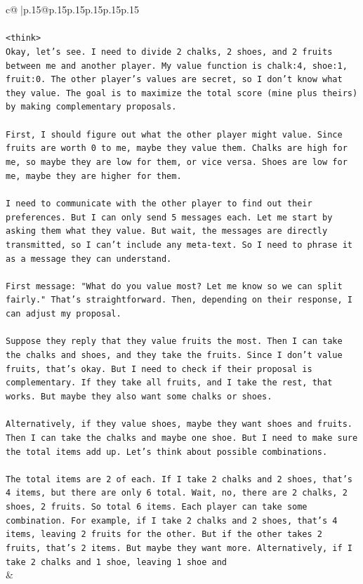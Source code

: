 \documentclass{article}
\begin{document}
{\begin{supertabular}{c@{$\;$}|p{.15\linewidth}@{}p{.15\linewidth}p{.15\linewidth}p{.15\linewidth}p{.15\linewidth}p{.15\linewidth}}
{{{\\ 
\\ 
\texttt{<think>} \\
\texttt{Okay, let's see. I need to divide 2 chalks, 2 shoes, and 2 fruits between me and another player. My value function is chalk:4, shoe:1, fruit:0. The other player's values are secret, so I don't know what they value. The goal is to maximize the total score (mine plus theirs) by making complementary proposals.} \\
\\ 
\texttt{First, I should figure out what the other player might value. Since fruits are worth 0 to me, maybe they value them. Chalks are high for me, so maybe they are low for them, or vice versa. Shoes are low for me, maybe they are higher for them.} \\
\\ 
\texttt{I need to communicate with the other player to find out their preferences. But I can only send 5 messages each. Let me start by asking them what they value. But wait, the messages are directly transmitted, so I can't include any meta{-}text. So I need to phrase it as a message they can understand.} \\
\\ 
\texttt{First message: "What do you value most? Let me know so we can split fairly." That's straightforward. Then, depending on their response, I can adjust my proposal.} \\
\\ 
\texttt{Suppose they reply that they value fruits the most. Then I can take the chalks and shoes, and they take the fruits. Since I don't value fruits, that's okay. But I need to check if their proposal is complementary. If they take all fruits, and I take the rest, that works. But maybe they also want some chalks or shoes.} \\
\\ 
\texttt{Alternatively, if they value shoes, maybe they want shoes and fruits. Then I can take the chalks and maybe one shoe. But I need to make sure the total items add up. Let's think about possible combinations.} \\
\\ 
\texttt{The total items are 2 of each. If I take 2 chalks and 2 shoes, that's 4 items, but there are only 6 total. Wait, no, there are 2 chalks, 2 shoes, 2 fruits. So total 6 items. Each player can take some combination. For example, if I take 2 chalks and 2 shoes, that's 4 items, leaving 2 fruits for the other. But if the other takes 2 fruits, that's 2 items. But maybe they want more. Alternatively, if I take 2 chalks and 1 shoe, leaving 1 shoe and} \\
            }
        }
    }
    & \\ \\


\end{supertabular}}
\end{document}
